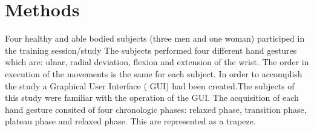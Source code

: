 \section{Methods}%

Four healthy and able bodied subjects \left(three men and one woman\right) participed in the training session/study%
The subjects performed four different hand gestures which are: ulnar, radial deviation, flexion and extension of the wrist. The order in execution of the movements is the same for each subject.
In order to accomplish the study a Graphical User Interface \left( GUI\right) had been created.The subjects of this study were familiar with the operation of the GUI.
The acquisition of each hand gesture consited of four chronologic phases: relaxed phase, transition phase, plateau phase and relaxed phase. This are represented as a trapeze.  